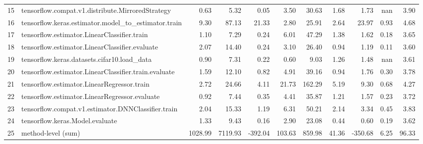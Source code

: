 \begin{tabular}{llrrrrrrrrr}
15 & tensorflow.compat.v1.distribute.MirroredStrategy & 0.63 & 5.32 & 0.05 & 3.50 & 30.63 & 1.68 & 1.73 & nan & 3.90 \\
16 & tensorflow.keras.estimator.model_to_estimator.train & 9.30 & 87.13 & 21.33 & 2.80 & 25.91 & 2.64 & 23.97 & 0.93 & 4.68 \\
17 & tensorflow.estimator.LinearClassifier.train & 1.10 & 7.29 & 0.24 & 6.01 & 47.29 & 1.38 & 1.62 & 0.18 & 3.65 \\
18 & tensorflow.estimator.LinearClassifier.evaluate & 2.07 & 14.40 & 0.24 & 3.10 & 26.40 & 0.94 & 1.19 & 0.11 & 3.60 \\
19 & tensorflow.keras.datasets.cifar10.load_data & 0.90 & 7.31 & 0.22 & 0.60 & 9.03 & 1.26 & 1.48 & nan & 3.61 \\
20 & tensorflow.estimator.LinearClassifier.train.evaluate & 1.59 & 12.10 & 0.82 & 4.91 & 39.16 & 0.94 & 1.76 & 0.30 & 3.78 \\
21 & tensorflow.estimator.LinearRegressor.train & 2.72 & 24.66 & 4.11 & 21.73 & 162.29 & 5.19 & 9.30 & 0.68 & 4.27 \\
22 & tensorflow.estimator.LinearRegressor.evaluate & 0.92 & 7.44 & 0.35 & 4.41 & 35.87 & 1.21 & 1.57 & 0.23 & 3.72 \\
23 & tensorflow.compat.v1.estimator.DNNClassifier.train & 2.04 & 15.33 & 1.19 & 6.31 & 50.21 & 2.14 & 3.34 & 0.45 & 3.83 \\
24 & tensorflow.keras.Model.evaluate & 1.33 & 9.43 & 0.16 & 2.90 & 23.08 & 0.44 & 0.60 & 0.19 & 3.62 \\
25 & method-level (sum) & 1028.99 & 7119.93 & -392.04 & 103.63 & 859.98 & 41.36 & -350.68 & 6.25 & 96.33 \\
\end{tabular}
